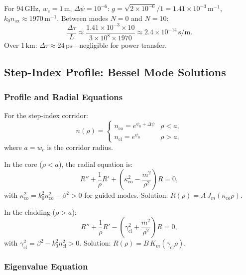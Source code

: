 \documentclass[journal,twocolumn]{IEEEtran}
\begin{document}
For 94\,GHz, $w_c = 1$\,m, $\Delta\psi = 10^{-6}$:
$g = \sqrt{2\times10^{-6}}/1 = 1.41\times10^{-3}\,\text{m}^{-1}$,
$k_0 n_\text{ax} \approx 1970\,\text{m}^{-1}$. Between modes $N=0$ and $N=10$:
\begin{equation}
\frac{\Delta\tau}{L} \approx \frac{1.41\times10^{-3}\times 10}
{3\times10^8 \times 1970} \approx 2.4\times10^{-14}\,\text{s/m}.
\end{equation}
Over 1\,km: $\Delta\tau \approx 24\,\text{ps}$---negligible for power transfer.

\subsection{Step-Index Profile: Bessel Mode Solutions}

\subsubsection{Profile and Radial Equations}

For the step-index corridor:
\begin{equation}
n(\rho) = \begin{cases}
n_\text{co} = e^{\psi_0 + \Delta\psi} & \rho < a, \\
n_\text{cl} = e^{\psi_0} & \rho > a,
\end{cases}
\label{eq:step_n}
\end{equation}
where $a = w_c$ is the corridor radius.

In the core ($\rho < a$), the radial equation is:
\begin{equation}
R'' + \frac{1}{\rho}R' + \left(\kappa_\text{co}^2 - \frac{m^2}{\rho^2}\right)R = 0,
\label{eq:core_radial}
\end{equation}
with $\kappa_\text{co}^2 = k_0^2 n_\text{co}^2 - \beta^2 > 0$ for guided modes.
Solution: $R(\rho) = A\,J_m(\kappa_\text{co}\rho)$.

In the cladding ($\rho > a$):
\begin{equation}
R'' + \frac{1}{\rho}R' - \left(\gamma_\text{cl}^2 + \frac{m^2}{\rho^2}\right)R = 0,
\end{equation}
with $\gamma_\text{cl}^2 = \beta^2 - k_0^2 n_\text{cl}^2 > 0$.
Solution: $R(\rho) = B\,K_m(\gamma_\text{cl}\rho)$.

\subsubsection{Eigenvalue Equation}
\end{document}
